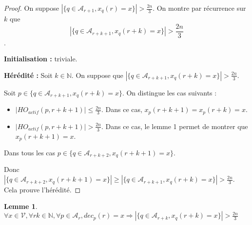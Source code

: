 \documentclass{article}
\newtheorem{lemma}{Lemme}
\begin{document}
\begin{proof}

	On suppose $| \{ q \in \mathcal{A}_{r+1} , x_q(r) = x \} | > \frac{2 n}{3}$. On montre par récurrence sur $k$ que
	$$| \{ q \in \mathcal{A}_{r+k+1} , x_q(r+k) = x \} | > \frac{2 n}{3}$$.

	\textbf{Initialisation :} triviale.

	\textbf{Hérédité :}
	Soit $k \in \mathds{N}$. On suppose que 
	$| \{ q \in \mathcal{A}_{r+k+1} , x_q(r+k) = x \} | > \frac{2 n}{3}$.

	Soit $p \in  \{ q \in \mathcal{A}_{r+k+1} , x_q(r+k) = x \} $. On distingue les cas suivants :

	\begin{itemize}

		\item $|HO_{actif} (p, r+k+1) | \leq \frac{2 n}{3}$. Dans ce cas, $x_p(r+k+1) = x_p(r+k) = x$.
		\item $|HO_{actif} (p, r+k+1) | > \frac{2 n}{3}$. Dans ce cas, le lemme 1 permet de montrer que $x_p(r+k+1) = x$.

	\end{itemize}

	Dans tous les cas $p \in \{ q \in \mathcal{A}_{r+k+2} , x_q(r+k+1) = x \} $. 

	Donc $| \{ q \in \mathcal{A}_{r+k+2} , x_q(r+k+1) = x \} | \geq | \{ q \in \mathcal{A}_{r+k+1} , x_q(r+k) = x \} | > \frac{2 n}{3}$.
	Cela prouve l'hérédité.
\end{proof}
\begin{lemma}
	$\forall x \in \mathcal{V}, \forall r k \in \mathds{N}, \forall p \in \mathcal{A}_r, dec_p(r) = x \Rightarrow| \{ q \in \mathcal{A}_{r+k} , x_q(r+k) = x \} | > \frac{2 n}{3}$
\end{lemma}
\end{document}
